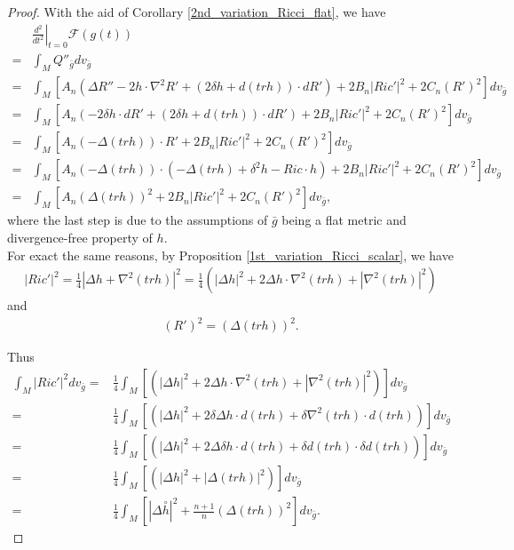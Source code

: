 \documentclass[12pt]{amsart}
\theoremstyle{definition}
\theoremstyle{remark}
\numberwithin{equation}{section}
\begin{document}
\begin{proof}

With the aid of Corollary \ref{2nd_variation_Ricci_flat}, we have
\begin{align*}
&\left. \frac{d^2}{dt^2}\right|_{t=0} \mathscr{F}(g(t))\\
 =& \int_M Q''_{\bar{g}} dv_{\bar{g}}\\
 =& \int_M \left[A_n(\Delta R'' - 2 h \cdot \nabla^2 R' + ( 2 \delta h + d (tr h)) \cdot dR') + 2 B_n |Ric'|^2 + 2C_n(R')^2 \right] dv_{\bar{g}}\\
 =& \int_M \left[A_n(- 2 \delta h \cdot d R' + ( 2 \delta h + d (tr h)) \cdot dR') + 2 B_n |Ric'|^2 + 2C_n(R')^2 \right] dv_{\bar{g}}\\
 =& \int_M \left[A_n(   - \Delta (tr h)) \cdot R' + 2 B_n |Ric'|^2 + 2C_n(R')^2 \right] dv_{\bar{g}}\\
 =& \int_M \left[A_n(   - \Delta (tr h)) \cdot (- \Delta (tr h) + \delta^2 h - Ric \cdot h) + 2 B_n |Ric'|^2 + 2C_n(R')^2 \right] dv_{\bar{g}}\\
 =& \int_M \left[A_n( \Delta (tr h))^2 + 2 B_n |Ric'|^2 + 2C_n(R')^2 \right] dv_{\bar{g}},
\end{align*}
where the last step is due to the assumptions of $\bar{g}$ being a flat metric and divergence-free property of $h$.\\

For exact the same reasons, by Proposition \ref{1st_variation_Ricci_scalar}, we have
\begin{align*}
|Ric'|^2 = \frac{1}{4} | \Delta h  + \nabla^2 (tr h)|^2 = \frac{1}{4} \left( |\Delta h|^2 + 2 \Delta h \cdot \nabla^2 (trh) + |\nabla^2 (tr h)|^2 \right)
\end{align*}
and
\begin{align*}
(R')^2 = ( \Delta (tr h))^2.
\end{align*}

Thus
\begin{align*}
  \int_M |Ric'|^2 dv_{\bar{g}}=& \frac{1}{4} \int_M\left[\left( |\Delta h|^2 + 2 \Delta h \cdot \nabla^2 (trh) + |\nabla^2 (tr h)|^2 \right)\right] dv_{\bar{g}}\\
 =& \frac{1}{4}\int_M \left[ \left( |\Delta h|^2 + 2 \delta\Delta h \cdot d(trh) + \delta\nabla^2 (tr h) \cdot d(tr h) \right)\right] dv_{\bar{g}}\\
 =& \frac{1}{4}\int_M \left[\left( |\Delta h|^2 + 2 \Delta \delta h \cdot d(trh) + \delta d (tr h) \cdot \delta d(tr h) \right)\right] dv_{\bar{g}}\\
 =& \frac{1}{4}\int_M \left[\left( |\Delta h|^2  + |\Delta (tr h)|^2 \right)\right] dv_{\bar{g}}\\
 =& \frac{1}{4}\int_M \left[ |\Delta \overset{\circ}{h}|^2 + \frac{n+1}{n}( \Delta (tr h))^2  \right] dv_{\bar{g}}.
\end{align*}


\end{proof}
\end{document}
